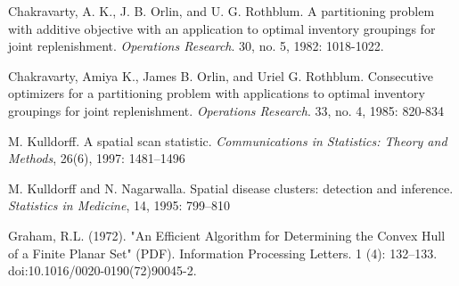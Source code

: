 \documentclass{article}
\theoremstyle{case}
\begin{document}
\begin{thebibliography}{1}

    Chakravarty, A. K., J. B. Orlin, and U. G. Rothblum. A partitioning problem with additive objective with an application to optimal inventory groupings for joint replenishment. {\em Operations Research}. 30, no. 5, 1982: 1018-1022.

     Chakravarty, Amiya K., James B. Orlin, and Uriel G. Rothblum. Consecutive optimizers for a partitioning problem with applications to optimal inventory groupings for joint replenishment. {\em Operations Research}. 33, no. 4, 1985: 820-834

	 M. Kulldorff. A spatial scan statistic. {\em Communications in Statistics: Theory and Methods}, 26(6), 1997: 1481–1496

	 M. Kulldorff and N. Nagarwalla. Spatial disease clusters: detection and inference. {\em Statistics in Medicine}, 14, 1995: 799–810
	
	 Graham, R.L. (1972). "An Efficient Algorithm for Determining the Convex Hull of a Finite Planar Set" (PDF). Information Processing Letters. 1 (4): 132–133. doi:10.1016/0020-0190(72)90045-2.	

\end{thebibliography}
\end{document}
